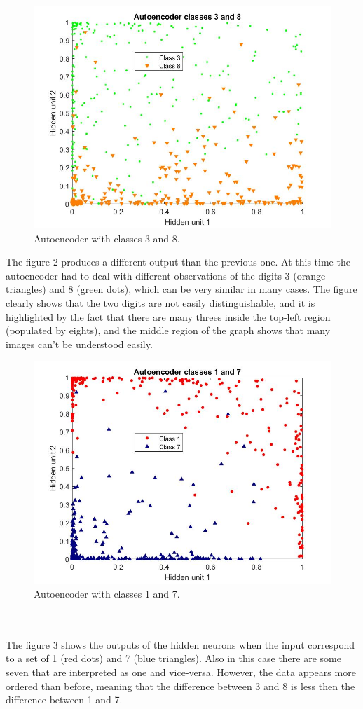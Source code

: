 \documentclass[10pt]{article}
\begin{document}
\begin{figure}[h] 
	\centering
	\includegraphics[width=0.9\columnwidth]{auto2.jpg} %
	\caption{Autoencoder with classes 3 and 8.}
\end{figure}
The figure 2 produces a different output than the previous
one. At this time the autoencoder had to deal with different observations of the digits 3 (orange triangles) and 8 (green dots),
which can be very similar in many cases. The figure clearly
shows that the two digits are not easily distinguishable, and it
is highlighted by the fact that there are many threes inside the
top-left region (populated by eights), and the middle region of
the graph shows that many images can’t be understood easily.
\\
\begin{figure}[h] 
	\centering
	\includegraphics[width=0.9\columnwidth]{auto3.jpg} %
	\caption{Autoencoder with classes 1 and 7.}
\end{figure}
\\\\
The figure 3 shows the outputs of the hidden neurons when the input correspond to a set of 1 (red dots) and 7 (blue
triangles). Also in this case there are some seven that are
interpreted as one and vice-versa. However, the data appears more ordered than before, meaning that the difference between
3 and 8 is less then the difference between 1 and 7.
\end{document}
